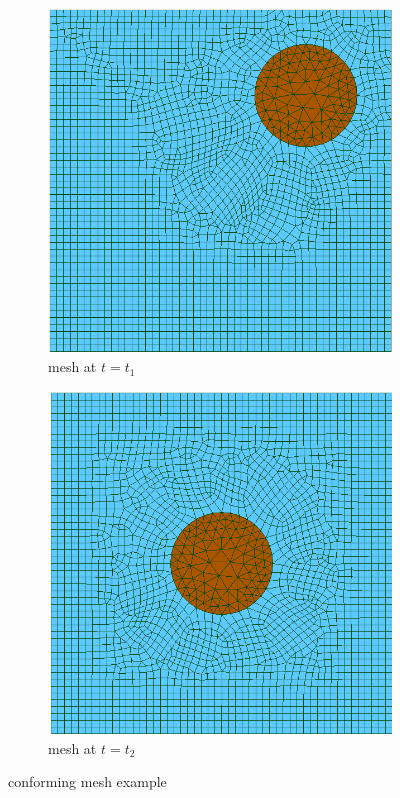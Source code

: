 \begin{figure}[htbp!]
	\centering
	\begin{subfigure}{.5\textwidth}
		\centering
		\includegraphics[width=.9\linewidth]{images/conf1c}
		\caption{mesh at $t=t_1$}
		\label{fig:c1}
	\end{subfigure}%
	\begin{subfigure}{.5\textwidth}
		\centering
		\includegraphics[width=.9\linewidth]{images/conf2c}
		\caption{mesh at $t=t_2$}
		\label{fig:c2}
	\end{subfigure}
	\caption{conforming mesh example}
	\label{fig:conf-mesh}
\end{figure}



